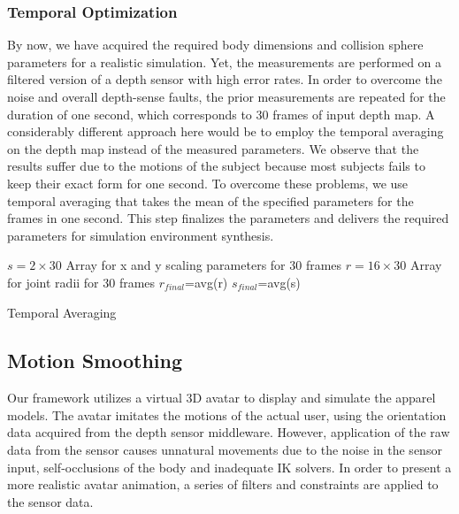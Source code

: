 \documentclass[number,preprint,review,12pt]{elsarticle}
\begin{document}
\doublespacing

\subsubsection{Temporal Optimization}
\label{subsec:4.3} 

By now, we have acquired the required body dimensions and collision sphere parameters for a realistic simulation. 
Yet, the measurements are performed on a filtered version of a depth sensor with high error rates. In order to overcome the noise and overall depth-sense faults,
 the prior measurements are repeated for the duration of one second, which corresponds to 30 frames of input depth map. 
A considerably different approach here would be to employ the temporal averaging on the depth map instead of the measured parameters. 
We observe that the results suffer due to the motions of the subject because most subjects fails to keep their exact form for one second. 
To overcome these problems, we use temporal averaging that takes the mean of the specified parameters for the frames in one second. 
This step finalizes the parameters and delivers the required parameters for simulation environment synthesis. 

\singlespacing

\begin{algorithm}
\DontPrintSemicolon %
$s=2 \times 30 $ Array for x and y scaling parameters for 30 frames\;
$r=16 \times 30 $ Array for joint radii for 30 frames\;
$r_\textit{final}$=avg(r)\;
$s_\textit{final}$=avg(s)\;
\caption{Temporal Averaging}
\label{algo:temporal_averaging}
\end{algorithm}

\doublespacing


\subsection{Motion Smoothing}
\label{subsec:Motion}
Our framework utilizes a virtual 3D avatar to display and simulate the apparel models. The avatar imitates the motions of the actual user, using the orientation data acquired from the depth sensor middleware. However, application of the raw data from the sensor causes unnatural movements due to the noise in the sensor input, self-occlusions of the body and inadequate IK solvers.  In order to present a more realistic avatar animation, a series of filters and constraints are applied to the sensor data. 
\end{document}
